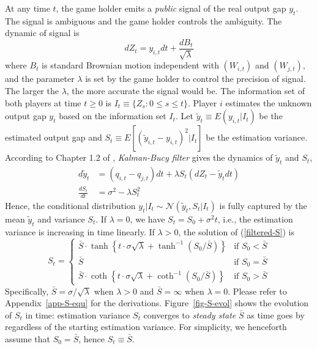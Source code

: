 \documentclass[a4paper, 11pt]{article}
\theoremstyle{plain} %
\begin{document}
At any time $t$, the game holder emits a \emph{public} signal of the real output gap $y_t$. 
The signal is ambiguous and the game holder controls the ambiguity. 
The dynamic of signal is  
\begin{equation}\label{signal}
	dZ_{t} = y_{i,t}dt + \frac{dB_{t}}{\sqrt{\lambda}} 
\end{equation}
where $B_{t}$ is standard Brownian motion independent with $(W_{i,t})$ and $(W_{j,t})$, and the parameter $\lambda$ is set by the game holder to control the precision of signal. 
The larger the $\lambda$, the more accurate the signal would be. 
The information set of both players at time $t \ge 0$ is  $I_{t} \equiv \{Z_{s} : 0\le s \le t\}$. 
Player $i$ estimates the unknown output gap $y_t$ based on the information set $I_t$. 
Let $\tilde{y}_t \equiv E(y_{i,t}|I_t)$ be the estimated output gap and $S_t \equiv E[(\tilde{y}_{i,t}-y_{i,t})^2|I_t]$ be the estimation variance. 
According to Chapter 1.2 of \citet{Bensoussan1992Control}, \emph{Kalman-Bucy filter} gives the dynamics of $\tilde{y}_{t}$ and $S_{t}$, 
\begin{align}
	d\tilde{y}_{t} &= (q_{i,t}-q_{j,t})dt + \lambda S_{t}(dZ_{t}-\tilde{y}_{t}dt) 
	\label{filtered-x}\\
	\frac{dS_{t}}{dt} &= \sigma^2 - \lambda S_{t}^2
	\label{filtered-S}
\end{align} 
Hence, the conditional distribution $y_{t}|I_t\sim\mathcal{N}(\tilde{y}_{t},S_{t}|I_t)$ is fully captured by the mean $\tilde{y}_{t}$ and variance $S_{t}$. 
If $\lambda = 0$, we have $S_t = S_0+\sigma^2t$, i.e., the estimation variance is increasing in time linearly. 
If $\lambda > 0$, the solution of (\ref{filtered-S}) is
\begin{equation}\label{S-evolution} 
	S_t = 
	\begin{cases}
        \bar{S} \cdot \tanh\left\{t\cdot\sigma\sqrt{\lambda} +  \tanh^{-1}\left(S_0\big/\bar{S}\right)\right\} & \text{if } S_0 < \bar{S} \\
        \bar{S} & \text{if } S_0 = \bar{S} \\
        \bar{S} \cdot \coth\left\{t\cdot\sigma\sqrt{\lambda} +  \coth^{-1}\left(S_0\big/\bar{S}\right)\right\} & \text{if } S_0 > \bar{S} 
	\end{cases}
\end{equation}
Specifically, $\bar{S} = \sigma / \sqrt{\lambda}$ when $\lambda>0$ and $\bar{S} = \infty$ when $\lambda = 0$. 
Please refer to Appendix~\ref{app-S-equ} for the derivations. 
Figure~\ref{fig-S-evol} shows the evolution of $S_t$ in time: estimation variance $S_t$ converges to \emph{steady state} $\bar{S}$ as time goes by regardless of the starting estimation variance. 
For simplicity, we henceforth assume that $S_0 = \bar{S}$, hence $S_t\equiv \bar{S}$. 
\end{document}
